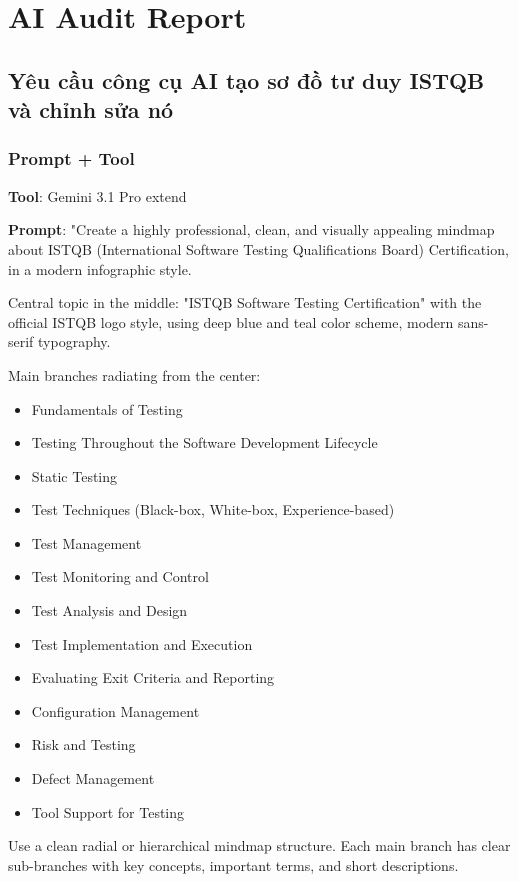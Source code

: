\section{AI Audit Report}

\subsection{Yêu cầu công cụ AI tạo sơ đồ tư duy ISTQB và chỉnh sửa nó}

\subsubsection{Prompt + Tool}
\textbf{Tool}: Gemini 3.1 Pro extend

\textbf{Prompt}: "Create a highly professional, clean, and visually appealing mindmap about ISTQB (International Software Testing Qualifications Board) Certification, in a modern infographic style.
\vspace{0.1cm}

Central topic in the middle: "ISTQB Software Testing Certification" with the official ISTQB logo style, using deep blue and teal color scheme, modern sans-serif typography.
\vspace{0.1cm}

Main branches radiating from the center:
\begin{itemize}
    \item Fundamentals of Testing
    \item Testing Throughout the Software Development Lifecycle
    \item Static Testing
    \item Test Techniques (Black-box, White-box, Experience-based)
    \item Test Management
    \item Test Monitoring and Control
    \item Test Analysis and Design
    \item Test Implementation and Execution
    \item Evaluating Exit Criteria and Reporting
    \item Configuration Management
    \item Risk and Testing
    \item Defect Management
    \item Tool Support for Testing
    
\end{itemize}

Use a clean radial or hierarchical mindmap structure. Each main branch has clear sub-branches with key concepts, important terms, and short descriptions.
\vspace{0.1cm}

